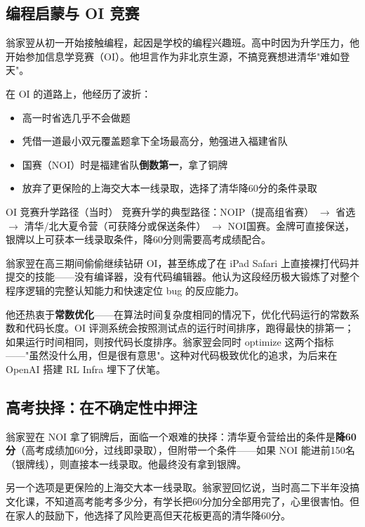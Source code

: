 \documentclass[a4paper]{article}
\begin{document}
\subsection{编程启蒙与 OI 竞赛}

翁家翌从初一开始接触编程，起因是学校的编程兴趣班。高中时因为升学压力，他开始参加信息学竞赛（OI）。他坦言作为非北京生源，不搞竞赛想进清华"难如登天"。

在 OI 的道路上，他经历了波折：
\begin{itemize}
    \item 高一时省选几乎不会做题
    \item 凭借一道最小双元覆盖题拿下全场最高分，勉强进入福建省队
    \item 国赛（NOI）时是福建省队\textbf{倒数第一}，拿了铜牌
    \item 放弃了更保险的上海交大本一线录取，选择了清华降60分的条件录取
\end{itemize}

\begin{knowledgebox}{OI 竞赛升学路径（当时）}
竞赛升学的典型路径：NOIP（提高组省赛） $\rightarrow$ 省选 $\rightarrow$ 清华/北大夏令营（可获降分或保送条件） $\rightarrow$ NOI国赛。金牌可直接保送，银牌以上可获本一线录取条件，降60分则需要高考成绩配合。
\end{knowledgebox}

翁家翌在高三期间偷偷继续钻研 OI，甚至练成了在 iPad Safari 上直接裸打代码并提交的技能——没有编译器，没有代码编辑器。他认为这段经历极大锻炼了对整个程序逻辑的完整认知能力和快速定位 bug 的反应能力。

他还热衷于\textbf{常数优化}——在算法时间复杂度相同的情况下，优化代码运行的常数系数和代码长度。OI 评测系统会按照测试点的运行时间排序，跑得最快的排第一；如果运行时间相同，则按代码长度排序。翁家翌会同时 optimize 这两个指标——"虽然没什么用，但是很有意思"。这种对代码极致优化的追求，为后来在 OpenAI 搭建 RL Infra 埋下了伏笔。

\subsection{高考抉择：在不确定性中押注}

翁家翌在 NOI 拿了铜牌后，面临一个艰难的抉择：清华夏令营给出的条件是\textbf{降60分}（高考成绩加60分，过线即录取），但附带一个条件——如果 NOI 能进前150名（银牌线），则直接本一线录取。他最终没有拿到银牌。

另一个选项是更保险的上海交大本一线录取。翁家翌回忆说，当时高二下半年没搞文化课，不知道高考能考多少分，有学长把60分加分全部用完了，心里很害怕。但在家人的鼓励下，他选择了风险更高但天花板更高的清华降60分。
\end{document}
